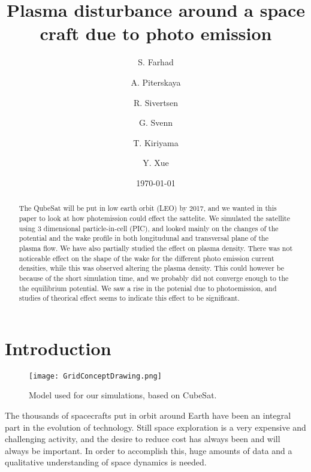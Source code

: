 \documentclass[aip, 
rsi, 
amsmath,
amssymb,
longbibliography,
preprint]{revtex4-1}
\begin{document}
\title[4th 4DSpace Workshop -- Team Godzilla -- Final Report]{Plasma disturbance around a space craft due to photo emission}

\author{S. Farhad} 
\author{A. Piterskaya}
\author{R. Sivertsen}
\author{G. Svenn}

\author{T. Kiriyama}
\author{Y. Xue}

\date{\today}

\begin{abstract}
The QubeSat will be put in low earth orbit (LEO) by 2017, and we wanted in this paper to look at how photemission could effect the sattelite. We simulated the satellite using 3 dimensional particle-in-cell (PIC), and looked mainly on the changes of the potential and the wake profile in both longitudunal and transversal plane of the plasma flow. We have also partially studied the effect on plasma density. There was not noticeable effect on the shape of the wake for the different photo emission current densities, while this was observed altering the plasma density. This could however be because of the short simulation time, and we probably did not converge enough to the the equilibrium potential. We saw a rise in the potenial due to photoemission, and studies of theorical effect seems to indicate this effect to be significant. 
\end{abstract}

\maketitle

\section{\label{sec:intro} Introduction}

\begin{figure*}[!ht]
\texttt{[image: GridConceptDrawing.png]}
\caption{Model used for our simulations, based on CubeSat.\label{fig:model}}
\end{figure*}

The thousands of spacecrafts put in orbit around Earth have been an integral part in the evolution of technology. Still space exploration is a very expensive and challenging activity, and the desire to reduce cost has always been and will always be important. In order to accomplish this, huge amounts of data and a qualitative understanding of space dynamics is needed. \\
\end{document}
